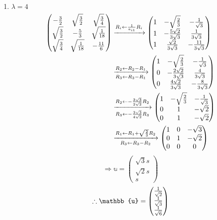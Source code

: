 \begin{enumerate}[wide, labelindent = 0pt, label = (\roman*)]
\item $\lambda = 4$
\begin{align*}
    \begin{pmatrix}
        -\frac{3}{2}       & \sqrt{\frac{3}{2}} & \sqrt{\frac{3}{4}} \\
        \sqrt{\frac{3}{2}} & -\frac{5}{3}       & \sqrt{\frac{1}{18}}    \\
        \sqrt{\frac{3}{4}} & \sqrt{\frac{1}{18}}    & -\frac{11}{6}
    \end{pmatrix}
    &\xrightarrow{R_i \leftarrow \frac{1}{a_{i1}} R_i} \begin{pmatrix}
        1 & -\sqrt{\frac{2}{3}}          & -\frac{1}{\sqrt{3}}       \\
        1 & -\frac{5\sqrt{2}}{3\sqrt{3}} & \frac{1}{3\sqrt{3}}       \\
        1 & \frac{\sqrt{2}}{3\sqrt{3}}   & -\frac{11}{3\sqrt{3}}
    \end{pmatrix} \\
    &\xrightarrow[R_3 \leftarrow R_3 - R_1]{R_2 \leftarrow R_2 - R_1} \begin{pmatrix}
        1 & -\sqrt{\frac{2}{3}}          & -\frac{1}{\sqrt{3}}      \\
        0 & -\frac{2\sqrt{2}}{3\sqrt{3}} & \frac{4}{3\sqrt{3}}  \\
        0 & \frac{4\sqrt{2}}{3\sqrt{3}}  & -\frac{8}{3\sqrt{3}}
    \end{pmatrix} \\
    &\xrightarrow[R_3 \leftarrow -\frac{3\sqrt{3}}{4\sqrt{2}} R_3]{R_2 \leftarrow -\frac{3\sqrt{3}}{2\sqrt{2}} R_2} \begin{pmatrix}
        1 & -\sqrt{\frac{2}{3}} & -\frac{1}{\sqrt{3}} \\
        0 & 1                   & -\sqrt{2}       \\
        0 & 1                   & -\sqrt{2}
    \end{pmatrix} \\
    &\xrightarrow[R_3 \leftarrow R_3 - R_2]{R_1 \leftarrow R_1 + \sqrt{\frac{2}{3}}R_2} \begin{pmatrix}
        1 & 0 & -\sqrt{3} \\
        0 & 1 & -\sqrt{2} \\
        0 & 0 & 0
    \end{pmatrix}
\end{align*}
\[
    \Rightarrow \mathbb{u} = \begin{pmatrix}
        \sqrt{3}s \\ \sqrt{2}s \\ s
    \end{pmatrix}
\]
\[
    \therefore \mathbb{u} = \begin{pmatrix}
        \inv{\sqrt{2}} \\ \inv{\sqrt{3}} \\ \inv{\sqrt{6}}
    \end{pmatrix}
\]
\end{enumerate}
